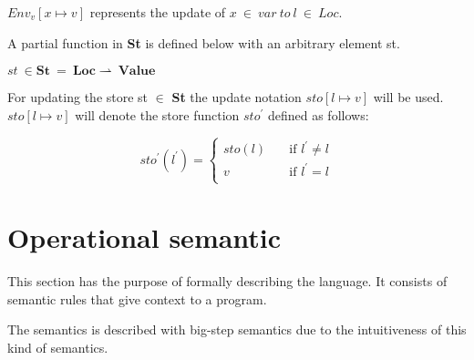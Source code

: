 	\begin{math}Env_v[x \mapsto v] \end{math} represents the update of \begin{math} x \ \in \ var \ to \ l \ \in \ Loc.\end{math} 
	
	
	
	
	
	A partial function in \textbf{St} is defined below with an arbitrary element st.
	
	
	
	
	
	\begin{math}		
		st \ \in \boldsymbol{St} \ = \ \boldsymbol{Loc} \rightharpoonup \ \boldsymbol{Value}		
	\end{math}
	
	
	
	
	
	For updating the store st \begin{math} \in \end{math} \textbf{St} the update notation \begin{math} sto[l \mapsto v] \end{math} will be used. \begin{math} sto[l \mapsto v] \end{math} will denote the store function \begin{math}sto^{'} \end{math} defined as follows:
	
	
	
	
	
	\[ sto^{'}(l^{'}) =	
	\begin{cases}	
	sto(l) & \quad \text{if } l^{'} \not= l\\	
	v & \quad \text{if } l^{'} = l\\	
	\end{cases}	
	\]
	
	
	
	
	
	\section{Operational semantic}
	
	
	This section has the purpose of formally describing the language. It consists of semantic rules that give context to a program. 
	
	
	The semantics is described with big-step semantics due to the intuitiveness of this kind of semantics. 
	
